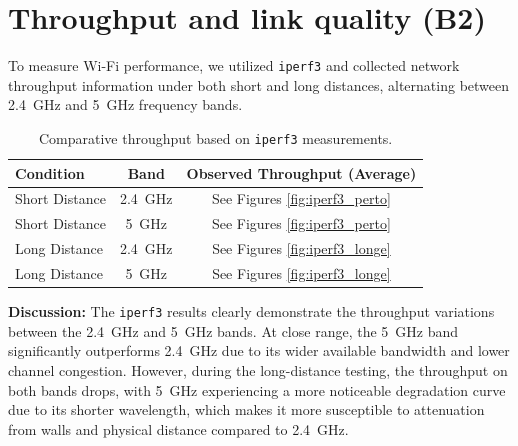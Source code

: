 \documentclass[12pt,a4paper]{report}
\begin{document}
\section{Throughput and link quality (B2)}
To measure Wi-Fi performance, we utilized \texttt{iperf3} \cite{iperf3} and collected network throughput information under both short and long distances, alternating between \SI{2.4}{\GHz} and \SI{5}{\GHz} frequency bands.

\begin{table}[H]
    \centering
    \caption{Comparative throughput based on \texttt{iperf3} measurements.}
    \label{tab:throughput_measurements}
    \begin{tabularx}{\textwidth}{X c c}
        \toprule
        \textbf{Condition} & \textbf{Band} & \textbf{Observed Throughput (Average)} \\
        \midrule
        Short Distance & \SI{2.4}{\GHz} & See Figures \ref{fig:iperf3_perto} \\
        Short Distance & \SI{5}{\GHz}   & See Figures \ref{fig:iperf3_perto} \\
        \midrule
        Long Distance & \SI{2.4}{\GHz} & See Figures \ref{fig:iperf3_longe} \\
        Long Distance & \SI{5}{\GHz}   & See Figures \ref{fig:iperf3_longe} \\
        \bottomrule
    \end{tabularx}
\end{table}

\textbf{Discussion:} 
The \texttt{iperf3} results clearly demonstrate the throughput variations between the \SI{2.4}{\GHz} and \SI{5}{\GHz} bands. At close range, the \SI{5}{\GHz} band significantly outperforms \SI{2.4}{\GHz} due to its wider available bandwidth and lower channel congestion. However, during the long-distance testing, the throughput on both bands drops, with \SI{5}{\GHz} experiencing a more noticeable degradation curve due to its shorter wavelength, which makes it more susceptible to attenuation from walls and physical distance compared to \SI{2.4}{\GHz}.
\end{document}

